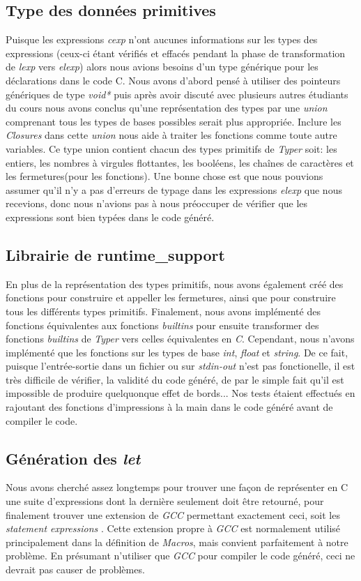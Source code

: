 \documentclass{article}
\begin{document}
\subsection{Type des données primitives}
Puisque les expressions \emph{cexp} n'ont aucunes informations sur les types
des expressions (ceux-ci étant vérifiés et effacés pendant la phase de 
transformation de \emph{lexp} vers \emph{elexp}) alors nous avions besoins d'un
type générique pour les déclarations dans le code C. Nous avons d'abord pensé à
utiliser des pointeurs génériques de type \emph{void*} puis après avoir discuté
avec plusieurs autres étudiants du cours nous avons conclus qu'une
représentation des types par une \emph{union} comprenant tous les types de bases
possibles serait plus appropriée. Inclure les \emph{Closures} dans cette
\emph{union} nous aide à traiter les fonctions comme toute autre variables.
Ce type union contient chacun des types primitifs de \emph{Typer} soit:
les entiers, les nombres à virgules flottantes, les booléens, les chaînes de
caractères et les fermetures(pour les fonctions). Une bonne chose est que nous
pouvions assumer qu'il n'y a pas d'erreurs de typage dans les expressions
\emph{elexp} que nous recevions, donc nous n'avions pas à nous préoccuper de
vérifier que les expressions sont bien typées dans le code généré.

\subsection{Librairie de runtime\_support}
En plus de la représentation des types primitifs, nous avons également créé
des fonctions pour construire et appeller les fermetures, ainsi que pour
construire tous les différents types primitifs.
Finalement, nous avons implémenté des fonctions équivalentes aux fonctions
\textit{builtins} pour ensuite transformer des fonctions \textit{builtins}
de \emph{Typer} vers celles équivalentes en \emph{C}. Cependant, nous n'avons
implémenté que les fonctions sur les types de base \emph{int}, \emph{float}
et \emph{string}. De ce fait, puisque l'entrée-sortie dans un fichier ou sur
\emph{stdin-out} n'est pas fonctionelle, il est très difficile de vérifier, la
validité du code généré, de par le simple fait qu'il est impossible de produire
quelquonque effet de bords... Nos tests étaient effectués en rajoutant des
fonctions d'impressions à la main dans le code généré avant de compiler le code.

\subsection{Génération des \emph{let}}
Nous avons cherché assez longtemps pour trouver une façon de représenter en
C une suite d'expressions dont la dernière seulement doit être retourné, pour
finalement trouver une extension de \emph{GCC} permettant exactement ceci,
soit les \emph{statement expressions}\cite{gnustatexprs}
\cite{stackstatexprs}. Cette extension propre
à \emph{GCC} est normalement utilisé principalement dans la définition de
\emph{Macros}, mais convient parfaitement à notre problème. En présumant
n'utiliser que \emph{GCC} pour compiler le code généré, ceci ne devrait pas
causer de problèmes.
\end{document}
